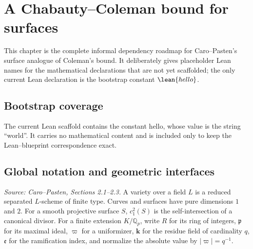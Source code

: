 \section{A Chabauty--Coleman bound for surfaces}


This chapter is the complete informal dependency roadmap for Caro--Pasten's
surface analogue of Coleman's bound.  It deliberately gives placeholder Lean
names for the mathematical declarations that are not yet scaffolded; the only
current Lean declaration is the bootstrap constant \(\lean{hello}\).

\subsection{Bootstrap coverage}

\begin{definition}
  \label{def:bootstrap_hello}
  The current Lean scaffold contains the constant \(\mathrm{hello}\), whose
  value is the string ``world''.  It carries no mathematical content and is
  included only to keep the Lean--blueprint correspondence exact.
\end{definition}

\subsection{Global notation and geometric interfaces}

\begin{definition}
  \label{def:cp_notation}
  \textit{Source: Caro--Pasten, Sections 2.1--2.3.}
  A variety over a field \(L\) is a reduced separated \(L\)-scheme of finite
  type.  Curves and surfaces have pure dimensions \(1\) and \(2\).  For a smooth
  projective surface \(S\), \(c_1^2(S)\) is the self-intersection of a canonical
  divisor.  For a finite extension \(K/\mathbb Q_p\), write \(R\) for its ring
  of integers, \(\mathfrak p\) for its maximal ideal, \(\varpi\) for a
  uniformizer, \(\mathbf k\) for the residue field of cardinality \(q\),
  \(\mathfrak e\) for the ramification index, and normalize the absolute value
  by \(|\varpi|=q^{-1}\).
\end{definition}

